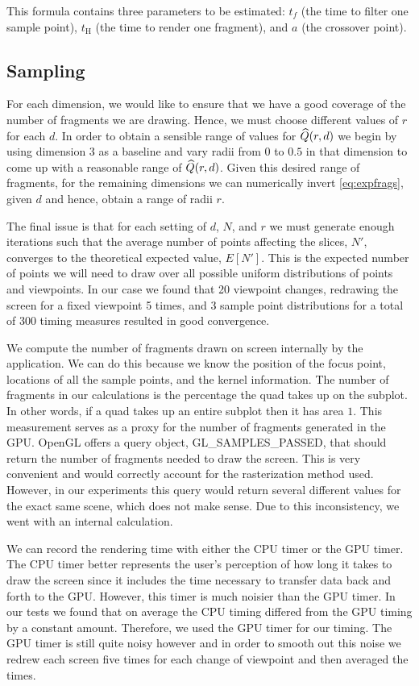 This formula contains three parameters to be estimated: $t_f$ (the time to filter one sample
point), $t_\text{H}$ (the time to render one fragment), and $a$ (the crossover 
point).

\subsection{Sampling}
\label{sampling}

For each dimension, we would like to ensure that we have a good coverage of
the number of fragments we are drawing.
Hence, we must choose different values of $r$ for each $d$.
In order to 
obtain
a sensible range of values for $\widehat{Q}(r,d)$ we begin by using dimension 3
as a baseline and vary radii from $0$ to $0.5$ in that dimension to come 
up with a reasonable
range of $\widehat{Q}(r,d)$.
Given this desired range of fragments,
for the remaining dimensions we can numerically invert
\autoref{eq:expfrags},
given $d$ and hence, obtain a range of radii $r$. 

The final issue is that for each setting of $d$, $N$, and $r$ we must
generate enough iterations such that the average number of points affecting
the slices, $N'$, converges to the theoretical expected value, $E[N']$. 
This is the expected number of points we will need to draw over all possible
uniform distributions of points and viewpoints. In our case we found that
20 viewpoint changes, redrawing the screen for a fixed viewpoint 5 times,
and 3 sample
point distributions for a total of 300 timing measures resulted in good
convergence.

We compute the number of fragments drawn on screen internally by the 
application.  We can do this because we know the position of the focus
point, locations of all the sample points, and the kernel information.  
The number of fragments in our calculations is the percentage the quad takes
up on the subplot.
In other words, if a quad takes up an entire subplot then
it has area $1$.
This measurement serves as a proxy 
for the number of fragments generated in the GPU.  
OpenGL offers a query 
object, GL\_SAMPLES\_PASSED, that should return the number of fragments 
needed to draw
the screen.  This is very convenient and would correctly account for the 
rasterization method used.  However, in our experiments this query would 
return several different values for the exact same scene, which does not
make sense.
Due to this inconsistency, we went with an internal calculation.

We can record the rendering time with either the CPU timer or the GPU timer.
The CPU timer better represents the user's perception of how long it takes
to draw the screen since it includes the time necessary to transfer data back
and forth to the GPU.  However, this timer is much noisier than the GPU
timer.  In our tests we found that on average the CPU timing differed from
the GPU timing by a constant amount.  Therefore, we used the GPU timer for
our timing.  The GPU timer is still quite noisy however and in order to 
smooth out this noise we redrew each screen five times for each change of
viewpoint and then averaged the times.

